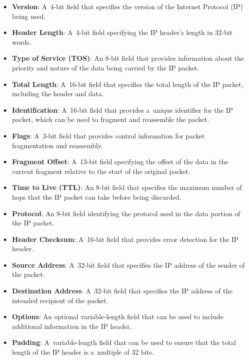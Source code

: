 \documentclass[
  printed,     %
  color,       %
  oneside,     %
  nosansbold,  %
  nocolorbold, %
  nolof,         %
  nolot,         %
]{fithesis4}
\begin{document}
\begin{itemize}[noitemsep,topsep=0pt]
    \item \textbf{Version}: A~4-bit field that specifies the version of the Internet Protocol (IP) being used.
    \item \textbf{Header Length}: A~4-bit field specifying the IP header's length in 32-bit words.
    \item \textbf{Type of Service (TOS)}: An 8-bit field that provides information about the priority and nature of the data being carried by the IP packet.
    \item \textbf{Total Length}: A~16-bit field that specifies the total length of the IP packet, including the header and data.
    \item \textbf{Identification}: A~16-bit field that provides a~unique identifier for the IP packet, which can be used to fragment and reassemble the packet.
    \item \textbf{Flags}: A~3-bit field that provides control information for packet fragmentation and reassembly.
    \item \textbf{Fragment Offset}: A~13-bit field specifying the offset of the data in the current fragment relative to the start of the original packet.
    \item \textbf{Time to Live (TTL)}: An 8-bit field that specifies the maximum number of hops that the IP packet can take before being discarded.
    \item \textbf{Protocol}: An 8-bit field identifying the protocol used in the data portion of the IP packet.
    \item \textbf{Header Checksum}: A~16-bit field that provides error detection for the IP header.
    \item \textbf{Source Address}: A~32-bit field that specifies the IP address of the sender of the packet.
    \item \textbf{Destination Address}: A~32-bit field that specifies the IP address of the intended recipient of the packet.
    \item \textbf{Options}: An optional variable-length field that can be used to include additional information in the IP header.
    \item \textbf{Padding}: A~variable-length field that can be used to ensure that the total length of the IP header is a~multiple of 32 bits.
\end{itemize}
\end{document}
